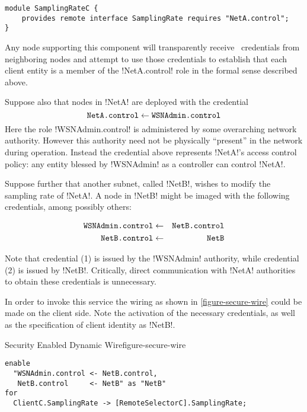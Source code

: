 \singlespace
\begin{lstlisting}
module SamplingRateC {
    provides remote interface SamplingRate requires "NetA.control";
}
\end{lstlisting}
\primaryspacing

Any node supporting this component will transparently receive \RT\ credentials from neighboring
nodes and attempt to use those credentials to establish that each client entity is a member of
the !NetA.control! role in the formal sense described above.

Suppose also that nodes in !NetA! are deployed with the credential
\begin{displaymath}
\texttt{NetA.control} \leftarrow \texttt{WSNAdmin.control}
\end{displaymath}
Here the role !WSNAdmin.control! is administered by some overarching network authority. However
this authority need not be physically ``present'' in the network during operation. Instead the
credential above represents !NetA!'s access control policy: any entity blessed by !WSNAdmin! as
a controller can control !NetA!.

Suppose further that another subnet, called !NetB!, wishes to modify the sampling rate of
!NetA!. A node in !NetB! might be imaged with the following credentials, among possibly others:

\singlespace
\begin{eqnarray}
\texttt{WSNAdmin.control} & \leftarrow & \texttt{NetB.control} \\
\texttt{NetB.control}     & \leftarrow & \texttt{NetB}
\end{eqnarray}
\primaryspacing

Note that credential (1) is issued by the !WSNAdmin! authority, while credential (2) is issued
by !NetB!. Critically, direct communication with !NetA! authorities to obtain these credentials
is unnecessary.

In order to invoke this service the wiring as shown in \autoref{figure-secure-wire} could be
made on the client side. Note the activation of the necessary credentials, as well as the
specification of client identity as !NetB!.

\begin{fpfig}[t]{Security Enabled Dynamic Wire}{figure-secure-wire}
{
\singlespace
\begin{lstlisting}
enable
  "WSNAdmin.control <- NetB.control, 
   NetB.control     <- NetB" as "NetB"
for 
  ClientC.SamplingRate -> [RemoteSelectorC].SamplingRate;
\end{lstlisting}
\primaryspacing
}
\end{fpfig}

